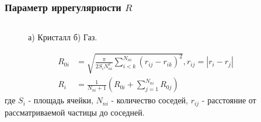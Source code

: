 \documentclass[pdf,hyperref={unicode}]{beamer}
\begin{document}
\begin{frame}%
\transdissolve[duration=0.2]
\frametitle{Параметр иррегулярности $R$}

\begin{columns}

\begin{column}{0.47\linewidth}

\begin{figure}[h]
\caption{ \tiny а) Кристалл б) Газ.}
\end{figure}


\tiny{
\begin{equation}
\begin{aligned}
R_{0i} &= \sqrt{\frac{\pi}{2 S_i N_{ni}^2} \sum\limits_{i<k}^{N_{ni}} (r_{ij} - r_{ik})^2}, r_{ij} = |r_i - r_j| \\
R_i &= \frac{1}{N_{ni} + 1} \left( R_{0i} + \sum\limits_{j=1}^{N_{ni}} R_{0j} \right)
\end{aligned}
\label{eqR}
\end{equation}
}
\tiny{где $S_i$ - площадь ячейки, $N_{ni}$ - количество соседей, $r_{ij}$ - расстояние от рассматриваемой частицы до соседней.}


\end{column}
\begin{column}{0.47\linewidth}


\end{column}
\end{columns}
\end{frame}
\end{document}
